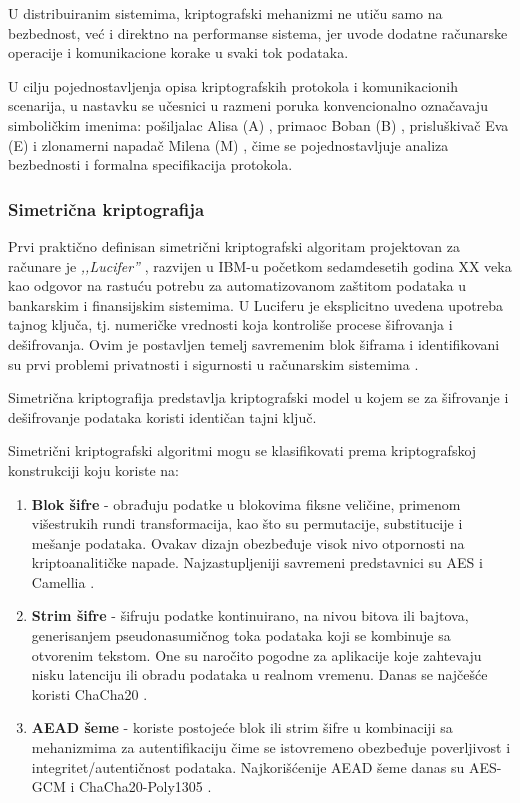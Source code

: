 U distribuiranim sistemima, kriptografski mehanizmi ne utiču samo na bezbednost, već i direktno na performanse sistema, jer uvode dodatne računarske operacije i komunikacione korake u svaki tok podataka.

U cilju pojednostavljenja opisa kriptografskih protokola i komunikacionih scenarija, u nastavku se učesnici u razmeni poruka konvencionalno označavaju simboličkim imenima: pošiljalac Alisa (A) , primaoc Boban (B) , prisluškivač Eva (E)  i zlonamerni napadač Milena (M) , čime se pojednostavljuje analiza bezbednosti i formalna specifikacija protokola.

\subsubsection{Simetrična kriptografija}
Prvi praktično definisan simetrični kriptografski algoritam projektovan za računare je \textit{,,Lucifer''} \cite{smith1971design}, razvijen u IBM-u početkom sedamdesetih godina XX veka kao odgovor na rastuću potrebu za automatizovanom zaštitom podataka u bankarskim i finansijskim sistemima. U Luciferu je eksplicitno uvedena upotreba tajnog ključa, tj. numeričke vrednosti koja kontroliše procese šifrovanja i dešifrovanja. Ovim je postavljen temelj savremenim blok šiframa i identifikovani su prvi problemi privatnosti i sigurnosti u računarskim sistemima \cite{feistel1973cryptography}.

\begin{definicija}
Simetrična kriptografija predstavlja kriptografski model u kojem se za šifrovanje i dešifrovanje podataka koristi identičan tajni ključ.
\end{definicija}

Simetrični kriptografski algoritmi mogu se klasifikovati prema kriptografskoj konstrukciji koju koriste na:
\begin{enumerate}
\item \textbf{Blok šifre} - obrađuju podatke u blokovima fiksne veličine, primenom višestrukih rundi transformacija, kao što su permutacije, substitucije i mešanje podataka. Ovakav dizajn obezbeđuje visok nivo otpornosti na kriptoanalitičke napade. Najzastupljeniji savremeni predstavnici su AES \cite{daemen2002design} i Camellia \cite{aoki2000camellia}.
\item \textbf{Strim  šifre} - šifruju podatke kontinuirano, na nivou bitova ili bajtova, generisanjem pseudonasumičnog toka podataka koji se kombinuje sa otvorenim tekstom. One su naročito pogodne za aplikacije koje zahtevaju nisku latenciju ili obradu podataka u realnom vremenu. Danas se najčešće koristi ChaCha20 \cite{bernstein2008chacha}.
\item \textbf{AEAD  šeme} - koriste postojeće blok ili strim šifre u kombinaciji sa mehanizmima za autentifikaciju čime se istovremeno obezbeđuje poverljivost i integritet/autentičnost podataka. Najkorišćenije AEAD šeme danas su AES-GCM \cite{kasper2009faster} i ChaCha20-Poly1305 \cite{nir2018chacha20}.
\end{enumerate}

